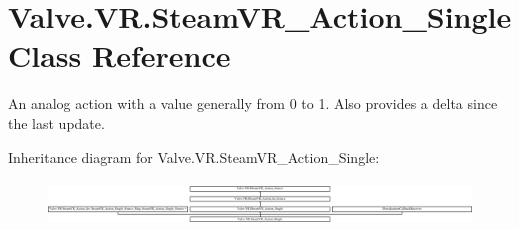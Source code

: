 \hypertarget{class_valve_1_1_v_r_1_1_steam_v_r___action___single}{}\section{Valve.\+V\+R.\+Steam\+V\+R\+\_\+\+Action\+\_\+\+Single Class Reference}
\label{class_valve_1_1_v_r_1_1_steam_v_r___action___single}


An analog action with a value generally from 0 to 1. Also provides a delta since the last update.  


Inheritance diagram for Valve.\+V\+R.\+Steam\+V\+R\+\_\+\+Action\+\_\+\+Single\+:\begin{figure}[H]
\begin{center}
\leavevmode
\includegraphics[height=1.200429cm]{class_valve_1_1_v_r_1_1_steam_v_r___action___single}
\end{center}
\end{figure}
